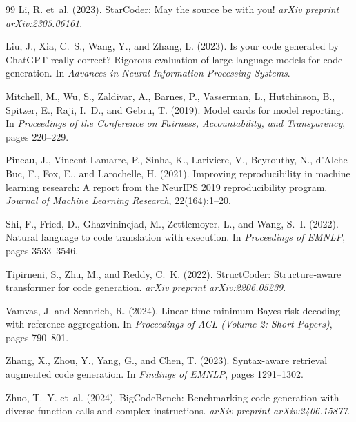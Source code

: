 \documentclass{article}
\begin{document}
{\begin{thebibliography}{99}
Li, R. et~al. (2023).
\newblock StarCoder: May the source be with you!
\newblock \emph{arXiv preprint arXiv:2305.06161}.

Liu, J., Xia, C.~S., Wang, Y., and Zhang, L. (2023).
\newblock Is your code generated by ChatGPT really correct? Rigorous evaluation of large language models for code generation.
\newblock In \emph{Advances in Neural Information Processing Systems}.

Mitchell, M., Wu, S., Zaldivar, A., Barnes, P., Vasserman, L., Hutchinson, B., Spitzer, E., Raji, I.~D., and Gebru, T. (2019).
\newblock Model cards for model reporting.
\newblock In \emph{Proceedings of the Conference on Fairness, Accountability, and Transparency}, pages 220--229.

Pineau, J., Vincent-Lamarre, P., Sinha, K., Lariviere, V., Beyrouthy, N., d'Alche-Buc, F., Fox, E., and Larochelle, H. (2021).
\newblock Improving reproducibility in machine learning research: A report from the NeurIPS 2019 reproducibility program.
\newblock \emph{Journal of Machine Learning Research}, 22(164):1--20.

Shi, F., Fried, D., Ghazvininejad, M., Zettlemoyer, L., and Wang, S.~I. (2022).
\newblock Natural language to code translation with execution.
\newblock In \emph{Proceedings of EMNLP}, pages 3533--3546.

Tipirneni, S., Zhu, M., and Reddy, C.~K. (2022).
\newblock StructCoder: Structure-aware transformer for code generation.
\newblock \emph{arXiv preprint arXiv:2206.05239}.

Vamvas, J. and Sennrich, R. (2024).
\newblock Linear-time minimum Bayes risk decoding with reference aggregation.
\newblock In \emph{Proceedings of ACL (Volume 2: Short Papers)}, pages 790--801.

Zhang, X., Zhou, Y., Yang, G., and Chen, T. (2023).
\newblock Syntax-aware retrieval augmented code generation.
\newblock In \emph{Findings of EMNLP}, pages 1291--1302.

Zhuo, T.~Y. et~al. (2024).
\newblock BigCodeBench: Benchmarking code generation with diverse function calls and complex instructions.
\newblock \emph{arXiv preprint arXiv:2406.15877}.

\end{thebibliography}
}


\newpage

\end{document}
